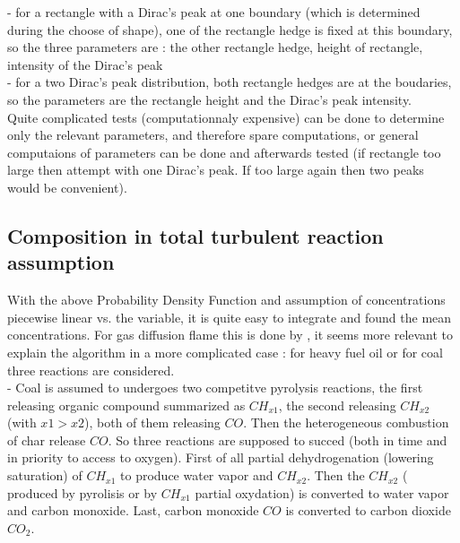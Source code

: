 - for a rectangle with a Dirac's peak at one boundary ({\small which
  is determined during the choose of shape}), one of the rectangle
  hedge is fixed at this boundary, so the three parameters are : the
  other rectangle hedge, height of rectangle, intensity of the Dirac's
  peak\\

- for a two Dirac's peak distribution, both rectangle hedges are at
   the boudaries, so the parameters are the rectangle height and the
   Dirac's peak intensity.\\

Quite complicated tests ({\small computationnaly expensive}) can be
done to determine only the relevant parameters, and therefore spare
computations, or general computaions of parameters can be done and
afterwards tested ({\small if rectangle too large then attempt with
one Dirac's peak. If too large again then two peaks would be
convenient}).
 
 

\subsection{Composition in total turbulent reaction assumption}

With the above Probability Density Function and assumption of
concentrations piecewise linear vs. the variable, it is quite easy to
integrate and found the mean concentrations. For gas diffusion flame
this is done by , it seems more relevant to
explain the algorithm in a more complicated case : for heavy fuel
oil  or for coal  three reactions are
considered. \\

- Coal is assumed to undergoes two competitve pyrolysis reactions, the
  first releasing organic compound summarized as $CH_{x1}$, the second
  releasing $CH_{x2}$ ({\small with $x1 > x2$}), both of them
  releasing $CO$. Then the heterogeneous combustion of char release
  $CO$. So three reactions are supposed to succed ({\small both in
  time and in priority to access to oxygen}). First of all partial
  dehydrogenation ({\small lowering saturation}) of $CH_{x1}$ to
  produce water vapor and $CH_{x2}$. Then the $CH_{x2}$ ({\small
  produced by pyrolisis or by $CH_{x1}$ partial oxydation}) is
  converted to water vapor and carbon monoxide. Last, carbon monoxide
  $CO$ is converted to carbon dioxide $CO_{2}$.\\


